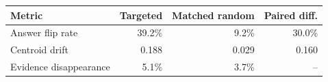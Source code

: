 \begin{tabular}{lrrr}
\toprule
Metric & Targeted & Matched random & Paired diff. \\
\midrule
Answer flip rate & 39.2\% & 9.2\% & 30.0\% \\
Centroid drift & 0.188 & 0.029 & 0.160 \\
Evidence disappearance & 5.1\% & 3.7\% & -- \\
\bottomrule
\end{tabular}
